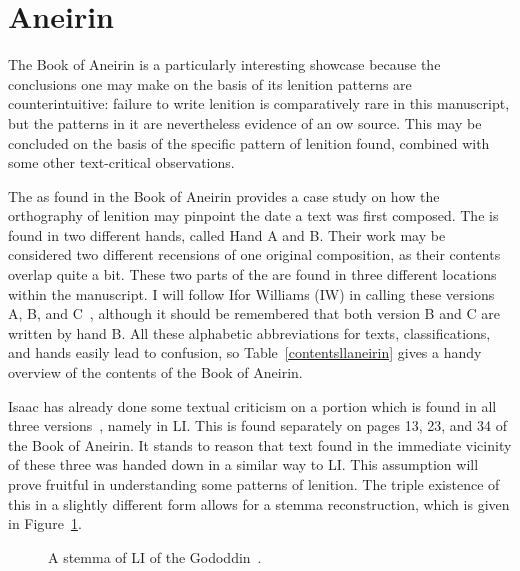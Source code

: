 \section{Aneirin}\label{sectionaneirin}
The Book of Aneirin is a particularly interesting showcase because the conclusions one may make on the basis of its lenition patterns are counterintuitive: failure to write lenition is comparatively rare in this manuscript, but the patterns in it are nevertheless evidence of an \gls{ow} source. This may be concluded on the basis of the specific pattern of lenition found, combined with some other text-critical observations.

The  as found in the Book of Aneirin provides a case study on how the orthography of lenition may pinpoint the date a text was first composed. The  is found in two different hands, called Hand A and B. Their work may be considered two different recensions of one original composition, as their contents overlap quite a bit. These two parts of the  are found in three different locations within the manuscript. I will follow Ifor Williams (IW) in calling these versions A, B, and C~\autocite*{williams_canu_1938}, although it should be remembered that both version B and C are written by hand B. All these alphabetic abbreviations for texts, classifications, and hands easily lead to confusion, so Table~\ref{contentsllaneirin} gives a handy overview of the contents of the Book of Aneirin.



Isaac has already done some textual criticism on a portion which is found in all three versions~\autocite{isaac_canu_1993}, namely in  LI. This  is found separately on pages 13, 23, and 34 of the Book of Aneirin. It stands to reason that text found in the immediate vicinity of these three   was handed down in a similar way to  LI. This assumption will prove fruitful in understanding some patterns of lenition. The triple existence of this  in a slightly different form allows for a stemma reconstruction, which is given in Figure~\ref{stemmagododdin}.

\begin{figure}[h]
    \centering
{}
    \caption{A stemma of  LI of the Gododdin~\autocite[77]{isaac_canu_1993}.}
    \label{stemmagododdin}
\end{figure}

